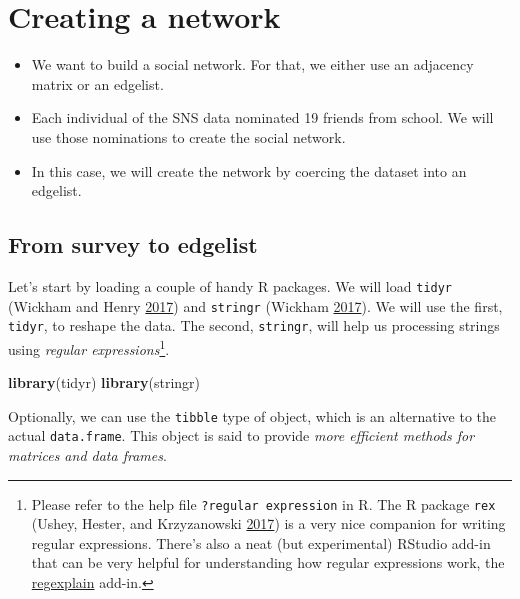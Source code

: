 \documentclass[]{book}
\newenvironment{Shaded}{\begin{snugshade}}{\end{snugshade}}
\newcommand{\KeywordTok}[1]{\textcolor[rgb]{0.13,0.29,0.53}{\textbf{#1}}}
\newcommand{\NormalTok}[1]{#1}
\begin{document}
\hypertarget{creating-a-network}{%
\section{Creating a network}\label{creating-a-network}}

\begin{itemize}
\item
  We want to build a social network. For that, we either use an adjacency matrix or an edgelist.
\item
  Each individual of the SNS data nominated 19 friends from school. We will use those nominations to create the social network.
\item
  In this case, we will create the network by coercing the dataset into an edgelist.
\end{itemize}

\hypertarget{from-survey-to-edgelist}{%
\subsection{From survey to edgelist}\label{from-survey-to-edgelist}}

Let's start by loading a couple of handy R packages. We will load \texttt{tidyr} (Wickham and Henry \protect\hyperlink{ref-R-tidyr}{2017}) and \texttt{stringr} (Wickham \protect\hyperlink{ref-R-stringr}{2017}). We will use the first, \texttt{tidyr}, to reshape the data. The second, \texttt{stringr}, will help us processing strings using \emph{regular expressions}\footnote{Please refer to the help file \texttt{?\textquotesingle{}regular\ expression\textquotesingle{}} in R. The R package \texttt{rex} (Ushey, Hester, and Krzyzanowski \protect\hyperlink{ref-R-rex}{2017}) is a very nice companion for writing regular expressions. There's also a neat (but experimental) RStudio add-in that can be very helpful for understanding how regular expressions work, the \href{https://github.com/gadenbuie/regexplain}{regexplain} add-in.}.

\begin{Shaded}
\begin{Highlighting}[]
\KeywordTok{library}\NormalTok{(tidyr)}
\KeywordTok{library}\NormalTok{(stringr)}
\end{Highlighting}
\end{Shaded}

Optionally, we can use the \texttt{tibble} type of object, which is an alternative to the actual \texttt{data.frame}. This object is said to provide \emph{more efficient methods for matrices and data frames}.
\end{document}
